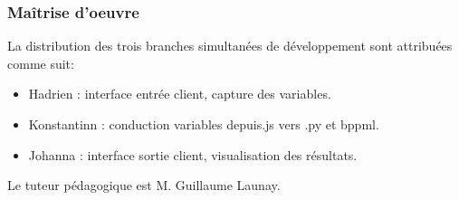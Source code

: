 \subsubsection{Maîtrise d'oeuvre}

La distribution des trois branches simultanées de développement sont attribuées comme suit:

\begin{itemize}
	\item Hadrien : interface entrée client, capture des variables.
	\item Konstantinn : conduction variables depuis.js vers .py et bppml.
	\item Johanna : interface sortie client, visualisation des résultats.
\end{itemize}


Le tuteur pédagogique est M. Guillaume Launay.

%
